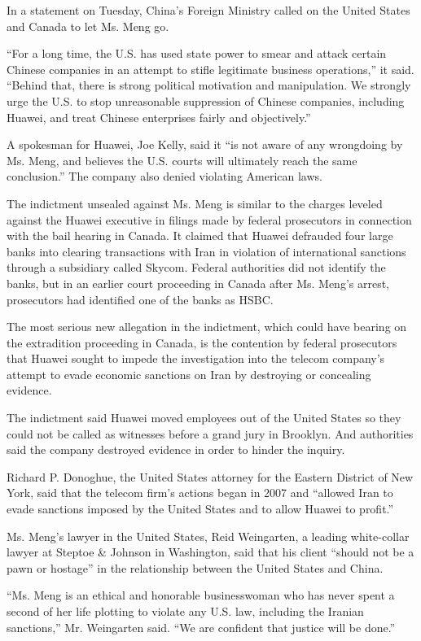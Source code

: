 In a statement on Tuesday, China's Foreign Ministry called on the United
States and Canada to let Ms. Meng go.

``For a long time, the U.S. has used state power to smear and attack
certain Chinese companies in an attempt to stifle legitimate business
operations,'' it said. ``Behind that, there is strong political
motivation and manipulation. We strongly urge the U.S. to stop
unreasonable suppression of Chinese companies, including Huawei, and
treat Chinese enterprises fairly and objectively.''

A spokesman for Huawei, Joe Kelly, said it ``is not aware of any
wrongdoing by Ms. Meng, and believes the U.S. courts will ultimately
reach the same conclusion.'' The company also denied violating American
laws.

The indictment unsealed against Ms. Meng is similar to the charges
leveled against the Huawei executive in filings made by federal
prosecutors in connection with the bail hearing in Canada. It claimed
that Huawei defrauded four large banks into clearing transactions with
Iran in violation of international sanctions through a subsidiary called
Skycom. Federal authorities did not identify the banks, but in an
earlier court proceeding in Canada after Ms. Meng's arrest, prosecutors
had identified one of the banks as HSBC.

The most serious new allegation in the indictment, which could have
bearing on the extradition proceeding in Canada, is the contention by
federal prosecutors that Huawei sought to impede the investigation into
the telecom company's attempt to evade economic sanctions on Iran by
destroying or concealing evidence.

The indictment said Huawei moved employees out of the United States so
they could not be called as witnesses before a grand jury in Brooklyn.
And authorities said the company destroyed evidence in order to hinder
the inquiry.

Richard P. Donoghue, the United States attorney for the Eastern District
of New York, said that the telecom firm's actions began in 2007 and
``allowed Iran to evade sanctions imposed by the United States and to
allow Huawei to profit.''

Ms. Meng's lawyer in the United States, Reid Weingarten, a leading
white-collar lawyer at Steptoe \& Johnson in Washington, said that his
client ``should not be a pawn or hostage'' in the relationship between
the United States and China.

``Ms. Meng is an ethical and honorable businesswoman who has never spent
a second of her life plotting to violate any U.S. law, including the
Iranian sanctions,'' Mr. Weingarten said. ``We are confident that
justice will be done.''


